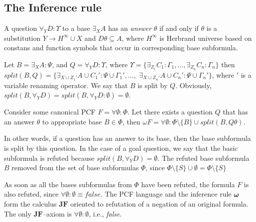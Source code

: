 \documentclass[runningheads,a4paper]{llncs}
\begin{document}
\subsection{The Inference rule}

\begin{definition}[Answer]
\label{answer}
A question $\forall_YD:\Upsilon$ to a base $\exists_XA$ has an {\em answer} $\theta$ if and only if $\theta$ is a substitution $Y \rightarrow H^{\infty} \cup X$ and $D\theta \subseteq A$, where $H^{\infty}$ is Herbrand universe based on constans and function symbols that occur in corresponding base subformula.
\end{definition}

\begin{definition}[Splitting]
\label{splitting}
Let $B = \exists_XA\colon\Psi$, and $Q = \forall_YD\colon\Upsilon$, where $\Upsilon = \{\exists_{Z_1}C_1\colon\Gamma_1,\ldots, \exists_{Z_n}C_n\colon\Gamma_n\}$ then $split(B,Q) = \{\exists_{X \cup {Z_1}'} A \cup {C_1}'\colon\Psi \cup {\Gamma_1}',\ldots,$ $\exists_{X \cup {Z_n}'} A \cup {C_n}'\colon\Psi \cup {\Gamma_n}'\}$, where $'$ is a variable renaming operator. We say that $B$ is split by $Q$. Obviously, $split(B,\forall_YD) = split(B,\forall_YD\colon\emptyset) = \emptyset$.
\end{definition}

\begin{definition}
Consider some canonical PCF $F = \forall\emptyset\colon\Phi$. Let there exists a question $Q$ that has an answer $\theta$ to appropriate base $B \in \Phi$, then $\omega F  = \forall \emptyset\colon\Phi \setminus \{B\} \cup split(B,Q\theta)$.
\end{definition}

In other words, if a question has an answer to its base, then the base subformula is split by this question.  In the case of a goal question, we say that the basic subformula is refuted because $split(B,\forall_YD) = \emptyset$. The refuted base subformula $B$ removed from the set of base subformulas $\Phi$, since $\Phi \setminus \{S\} \cup \emptyset = \Phi \setminus \{S\}$

As soon as all the bases subformulas from $\Phi$ have been refuted, the formula $F$ is also refuted, since $\forall \emptyset\colon\emptyset \equiv false$.  The PCF language and the inference rule $\boldsymbol{\omega}$ form the calculus $\boldsymbol{JF}$ oriented to refutation of a negation of an original formula.  The only $\boldsymbol{JF}$--axiom is $\forall \emptyset\colon\emptyset$, i.e., \emph{false}.
\end{document}
